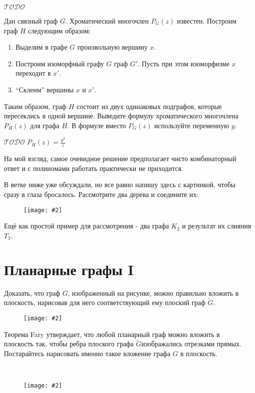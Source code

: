 \documentclass[a4paper,12pt]{article}
\numberwithin{figure}{section}
\def\TODO{\guillemotleft$\mathcal{TODO}$\guillemotright\textellipsis}
\def\Gwave{$\tilde{G}$}
\newcommand\CenterFigure[2]{
	\begin{figure}[H]
		\centering
		\texttt{[image: \#2]}
	\end{figure}
}
\begin{document}
\begin{problem}

	\TODO

	Дан связный граф $G$. Хроматический многочлен $P_G(z)$ известен. Построим граф $H$ следующим образом:
	\begin{enumerate}
		\item Выделим в графе $G$ произвольную вершину $x$.
		\item Построим изоморфный графу $G$ граф $G'$. Пусть при этом изоморфизме $x$ переходит в $x'$.
		\item ``Склеим'' вершины $x$ и $x'$.
	\end{enumerate}
	Таким образом, граф $H$ состоит из двух одинаковых подграфов, которые пересеклись в одной вершине. Выведите формулу хроматического многочлена $P_H(z)$ для графа $H$. В формуле вместо $P_G(z)$ используйте переменную $y$.
\end{problem}
\begin{solution}
	\TODO
	$\displaystyle P_H(z)=\frac{y^2}{z}$
	
	На мой взгляд, самое очевидное решение предполагает чисто комбинаторный ответ и с полиномами работать  практически не приходится.
	
	В ветке ниже уже обсуждали, но все равно напишу здесь с картинкой, чтобы сразу в глаза бросалось. Рассмотрите два дерева и соедините их:
		\CenterFigure{6cm}{chromatic-number-after-merge.png}
	Ещё как простой пример для рассмотрения - два графа $K_2$ и результат их слияния $T_3$.
\end{solution}



\section{Планарные графы I}


\begin{problem}
	Доказать, что граф $G$, изображенный на рисунке, можно правильно вложить в плоскость, нарисовав для него соответствующий ему плоский граф \Gwave.
	\CenterFigure{7cm}{planar1-step3-problem.png}
	Теорема Fary утверждает, что любой планарный граф можно вложить в плоскость так, чтобы ребра плоского графа \Gwave изображались отрезками прямых. Постарайтесь нарисовать именно такое вложение графа $G$ в плоскость. 
\end{problem}
\begin{solution}
	\ \\
	\CenterFigure{11cm}{planar1-step3-solution.png}
\end{solution}
\end{document}
